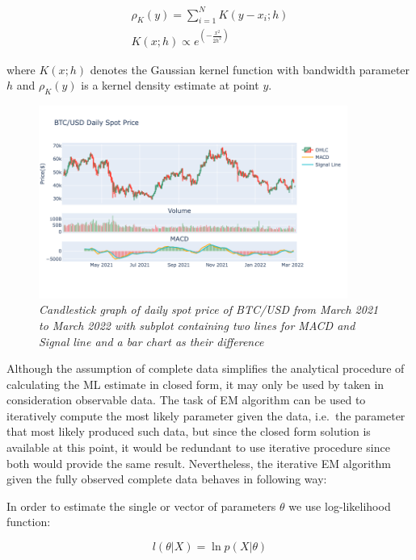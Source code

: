 \begin{gather} 
\rho_K(y) = \sum_{i=1}^{N} K(y - x_i;h)  \\
K(x;h) \propto e^{(-\frac{x^2}{2h^2})}
\end{gather}

where $K(x;h)$ denotes the Gaussian kernel function with bandwidth parameter $h$ and $\rho_K(y)$ is a kernel density estimate at point $y$.

\begin{figure}[ht]
\begin{center}
	\includegraphics[width=0.9\textwidth]{Figs/MACD.png}
\end{center}

\caption{\textit{ Candlestick graph of daily spot price of BTC/USD from March 2021 to March 2022 with subplot containing two lines for MACD and Signal line and a bar chart as their difference}}

\end{figure}

Although the assumption of complete data simplifies the analytical procedure of calculating the ML estimate in closed form, it may only be used by taken in consideration observable data. The task of EM algorithm can be used to iteratively compute the most likely parameter given the data, i.e.\ the parameter that most likely produced such data, but since the closed form solution is available at this point, it would be redundant to use iterative procedure since both would provide the same result. Nevertheless, the iterative EM algorithm given the fully observed complete data behaves in following way:

In order to estimate the single or vector of parameters $\theta$ we use log-likelihood function:

\begin{equation}
l(\theta|X) = \ln p(X|\theta) 
\end{equation}

